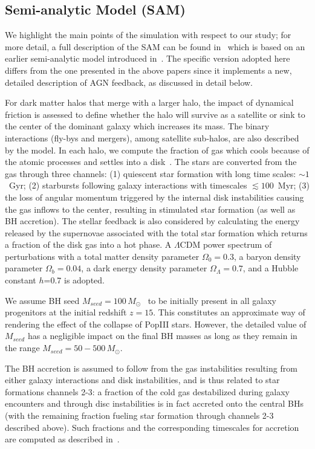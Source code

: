 \documentclass[twocolumn]{aastex631}
\begin{document}
\subsection{Semi-analytic Model (SAM)}\label{subsec:SAM}
We highlight the main points of the simulation with respect to our study; for more detail, a full description of the SAM can be found in~\citet{Menci2016} which is based on an earlier semi-analytic model introduced in~\citet{Menci2014}. The specific version adopted here differs from the one presented in the above papers since it implements a new, detailed description of AGN feedback, as discussed in detail below.

For dark matter halos that merge with a larger halo, the impact of dynamical friction is assessed to define whether the halo will survive as a satellite or sink to the center of the dominant galaxy which increases its mass. The binary interactions (fly-bys and mergers), among satellite sub-halos, are  also described by the model. In each halo, we compute the fraction of gas which cools because of the atomic processes and settles into a disk~\citep{Mo1998}. The stars are converted from the gas through three channels: (1) quiescent star formation with long time scales: $\sim1$~Gyr; (2) starbursts following galaxy interactions with timescales $\lesssim 100$~Myr;  (3) the loss of angular momentum triggered by the internal disk instabilities causing the gas inflows to the center, resulting in stimulated star formation (as well as BH accretion). The stellar feedback is also considered by calculating the energy released by the supernovae associated with the total star formation which returns a fraction of the disk gas into a hot phase. 
A $\Lambda$CDM power spectrum of perturbations with a total matter density parameter $\Omega_0=0.3$, a baryon density parameter 
$\Omega_b=0.04$, a dark energy density parameter $\Omega_\Lambda=0.7$, and a Hubble constant $h$=0.7 is adopted.

{We assume BH seed $M_{seed}=100\,M_{\odot}$~\citep{Madau2001}  to be initially present in all galaxy progenitors at the initial redshift $z=15$. This constitutes an approximate way of rendering the effect of the collapse of PopIII stars. However, the detailed value of $M_{seed}$ has a negligible impact on the final BH masses as long as they remain in the range $M_{seed}=50-500\,M_{\odot}$.
}

The BH accretion is assumed to follow from the gas instabilities resulting from either galaxy interactions and disk instabilities, and is thus related to star formations channels 2-3: a fraction of the cold gas destabilized during galaxy encounters and through disc instabilities is in fact accreted onto the central BHs (with the remaining fraction fueling star formation through channels 2-3 described above). Such fractions and the corresponding timescales for accretion are computed as described in~\citet[][in Section 3]{Menci2014}.
\end{document}
